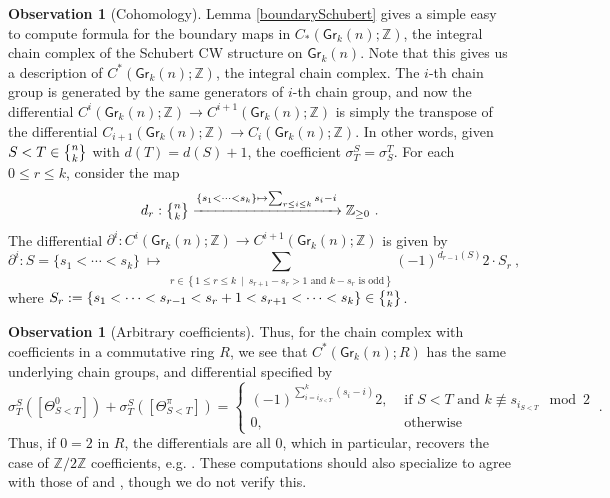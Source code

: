 \documentclass{article}
\newcommand{\bb}[1]{\mathbb{#1}}
\newcommand{\msf}[1]{\mathsf{#1}}
\newcommand{\gr}{\msf{Gr}}
\newcommand{\nchoosek}{\textstyle\genfrac{\lbrace}{\rbrace}{0pt}{}}
\theoremstyle{definition}
\newtheorem{observation}[theorem]{Observation}
\begin{document}
\begin{observation}[Cohomology]\label{cohomology}
    Lemma \ref{boundarySchubert} gives a simple easy to compute formula for the boundary maps in 
    $C_*(\gr_k(n);\bb{Z})$, the integral chain complex of the Schubert CW structure on $\gr_k(n)$. Note that this 
    gives us a description of $C^*(\gr_k(n);\bb{Z})$, the integral chain complex. The $i$-th chain group is
    generated by the same generators of $i$-th chain group, and now the differential
    $C^i(\gr_k(n);\bb{Z}) \to C^{i+1}(\gr_k(n);\bb{Z})$ is simply the transpose of the differential
    $C_{i+1}(\gr_k(n);\bb{Z}) \to C_i(\gr_k(n);\bb{Z})$. In other words, given $S<T \in \nchoosek{n}{k}$ with
    $d(T)=d(S)+1$, the coefficient $\sigma^S_T = \sigma^T_S$. 
    For each $0\leq r \leq k$, consider the map
    $$d_r : \nchoosek{n}{k} \xrightarrow{\{s_1<\cdots<s_k\} \mapsto\sum_{r\leq i \leq k} s_i-i} \ZZ_{\geq 0}~.$$
    The differential $\partial^i: C^i(\gr_k(n);\bb{Z}) \to C^{i+1}(\gr_k(n);\bb{Z})$ is given by
        \begin{equation}
            \partial^i : S = \{s_1< \cdots < s_k\} ~\mapsto~ \sum\limits_{r \in \left\{1 \leq r \leq k ~\mid~ s_{r+1}-s_r >1 
                \text{ and } k-s_r \text{ is odd}\right\}} (-1)^{d_{r-1}(S)} 2 \cdot S_r~,
        \end{equation}
        where $S_r:= \{s_1 < \cdots < s_{r-1} < s_r +1 < s_{r+1} <\cdots< s_k \} \in \nchoosek{n}{k}$.
\end{observation}


\begin{observation}[Arbitrary coefficients]\label{coefficients}
    Thus, for the chain complex with coefficients in a commutative ring $R$, we see that 
    $C^*(\gr_k(n); R)$ has the same underlying chain groups, and differential specified by 
    $$\sigma^S_T([\Theta_{S<T}^0])+\sigma^S_T([\Theta_{S<T}^\pi])
        = \begin{cases}
            (-1)^{\sum_{i=i_{S<T}}^k (s_i-i)} 2, &\text{ if } S<T \text{ and } k \not\equiv s_{i_{S<T}} \mod 2 \\
            0, &\text{ otherwise}
        \end{cases}~.$$
    Thus, if $0=2$ in $R$, the differentials are all $0$, which in particular, recovers the case of $\bb{Z}/2\bb{Z}$
    coefficients, e.g. \cite{characteristic}.
    These computations should also specialize to agree with those of \cite{borel} and \cite{takeuchi}, though we do
    not verify this.
\end{observation}
\end{document}
